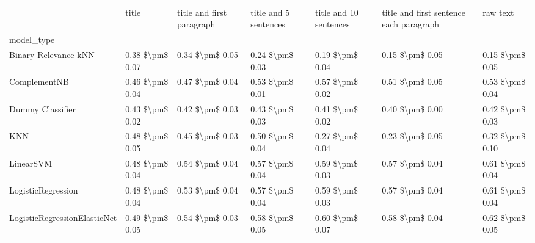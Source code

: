\begin{tabular}{lllllll}
\toprule
{} &            title & title and first paragraph & title and 5 sentences & title and 10 sentences & title and first sentence each paragraph &             raw text \\
model\_type                      &                  &                           &                       &                        &                                         &                      \\
\midrule
Binary Relevance kNN            &  0.38 \$\textbackslash pm\$ 0.07 &           0.34 \$\textbackslash pm\$ 0.05 &       0.24 \$\textbackslash pm\$ 0.03 &        0.19 \$\textbackslash pm\$ 0.04 &                         0.15 \$\textbackslash pm\$ 0.05 &      0.15 \$\textbackslash pm\$ 0.05 \\
ComplementNB                    &  0.46 \$\textbackslash pm\$ 0.04 &           0.47 \$\textbackslash pm\$ 0.04 &       0.53 \$\textbackslash pm\$ 0.01 &        0.57 \$\textbackslash pm\$ 0.02 &                         0.51 \$\textbackslash pm\$ 0.05 &      0.53 \$\textbackslash pm\$ 0.04 \\
Dummy Classifier                &  0.43 \$\textbackslash pm\$ 0.02 &           0.42 \$\textbackslash pm\$ 0.03 &       0.43 \$\textbackslash pm\$ 0.03 &        0.41 \$\textbackslash pm\$ 0.02 &                         0.40 \$\textbackslash pm\$ 0.00 &      0.42 \$\textbackslash pm\$ 0.03 \\
KNN                             &  0.48 \$\textbackslash pm\$ 0.05 &           0.45 \$\textbackslash pm\$ 0.03 &       0.50 \$\textbackslash pm\$ 0.04 &        0.27 \$\textbackslash pm\$ 0.04 &                         0.23 \$\textbackslash pm\$ 0.05 &      0.32 \$\textbackslash pm\$ 0.10 \\
LinearSVM                       &  0.48 \$\textbackslash pm\$ 0.04 &           0.54 \$\textbackslash pm\$ 0.04 &       0.57 \$\textbackslash pm\$ 0.04 &        0.59 \$\textbackslash pm\$ 0.03 &                         0.57 \$\textbackslash pm\$ 0.04 &      0.61 \$\textbackslash pm\$ 0.04 \\
LogisticRegression              &  0.48 \$\textbackslash pm\$ 0.04 &           0.53 \$\textbackslash pm\$ 0.04 &       0.57 \$\textbackslash pm\$ 0.04 &        0.59 \$\textbackslash pm\$ 0.03 &                         0.57 \$\textbackslash pm\$ 0.04 &      0.61 \$\textbackslash pm\$ 0.04 \\
LogisticRegressionElasticNet    &  0.49 \$\textbackslash pm\$ 0.05 &           0.54 \$\textbackslash pm\$ 0.03 &       0.58 \$\textbackslash pm\$ 0.05 &        0.60 \$\textbackslash pm\$ 0.07 &                         0.58 \$\textbackslash pm\$ 0.04 &      0.62 \$\textbackslash pm\$ 0.05 \\

\end{tabular}
